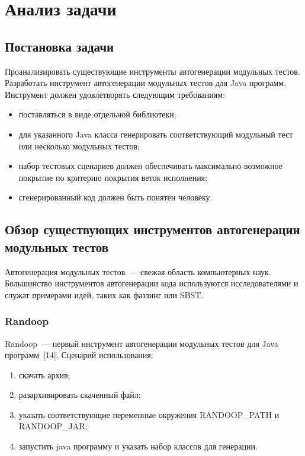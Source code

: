 \chapter{Анализ  задачи} 

\section{Постановка задачи}

Проанализировать существующие инструменты автогенерации модульных тестов. Разработать инструмент автогенерации модульных тестов для Java программ. Инструмент должен удовлетворять следующим требованиям:

\begin{itemize}
	\item поставляться в виде отдельной библиотеки;
	\item для указанного Java класса генерировать соответствующий модульный тест или несколько модульных тестов;
	\item набор тестовых сценариев должен обеспечивать максимально возможное покрытие по критерию покрытия веток исполнения;
	\item сгенерированный код должен быть понятен человеку.
\end{itemize}


\section{Обзор существующих инструментов автогенерации модульных тестов}

Автогенерация модульных тестов~--- свежая область компьютерных наук. Большинство инструментов автогенерации кода используются исследователями и служат примерами идей, таких как фаззинг или SBST. 

\subsection{Randoop}

Randoop~--- первый инструмент автогенерации модульных тестов для Java программ~[14]. Сценарий использования: 

\begin{enumerate}
	\item скачать архив;
	\item разархивировать скаченный файл;
	\item указать соответствующие переменные окружения RANDOOP\_PATH и RANDOOP\_JAR;
	\item запустить java программу и указать набор классов для генерации.
\end{enumerate}

